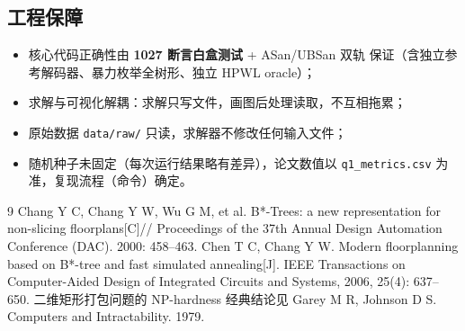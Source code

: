 \documentclass[12pt,a4paper]{article}
\begin{document}
\subsection{工程保障}

\begin{itemize}
    \item 核心代码正确性由 \textbf{1027 断言白盒测试} + ASan/UBSan 双轨
    保证（含独立参考解码器、暴力枚举全树形、独立 HPWL oracle）；
    \item 求解与可视化解耦：求解只写文件，画图后处理读取，不互相拖累；
    \item 原始数据 \texttt{data/raw/} 只读，求解器不修改任何输入文件；
    \item 随机种子未固定（每次运行结果略有差异），论文数值以
    \texttt{q1\_metrics.csv} 为准，复现流程（命令）确定。
\end{itemize}

\begin{thebibliography}{9}
 Chang Y C, Chang Y W, Wu G M, et al. B*-Trees: a new
  representation for non-slicing floorplans[C]// Proceedings of the 37th
  Annual Design Automation Conference (DAC). 2000: 458--463.
 Chen T C, Chang Y W. Modern floorplanning based on B*-tree
  and fast simulated annealing[J]. IEEE Transactions on Computer-Aided
  Design of Integrated Circuits and Systems, 2006, 25(4): 637--650.
 二维矩形打包问题的 NP-hardness 经典结论见
  Garey M R, Johnson D S. Computers and Intractability. 1979.
\end{thebibliography}
\end{document}
